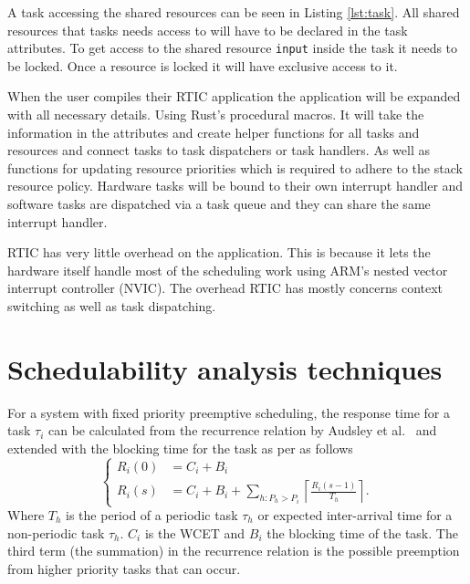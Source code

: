 A task accessing the shared resources can be seen in Listing \ref{lst:task}.
All shared resources that tasks needs access to will have to be declared in the
task attributes. To get access to the shared resource \texttt{input} inside the
task it needs to be locked. Once a resource is locked it will have exclusive
access to it.


When the user compiles their RTIC application the application will be expanded
with all necessary details. Using Rust's procedural macros. It will take the
information in the attributes and create helper functions for all tasks and
resources and connect tasks to task dispatchers or task handlers. As well as
functions for updating resource priorities which is required to adhere to the
stack resource policy. Hardware tasks will be bound to their own interrupt handler
and software tasks are dispatched via a task queue and they can share the same
interrupt handler.

RTIC has very little overhead on the application. This is because it lets the
hardware itself handle most of the scheduling work using ARM's nested vector
interrupt controller (NVIC).  The overhead RTIC has mostly concerns context switching
as well as task dispatching.

\section{Schedulability analysis techniques}
\label{theory:schedulability}
For a system with fixed priority preemptive scheduling, the response time for
a task $\tau_i$ can be calculated from the recurrence relation by Audsley et
al.\ \cite{audsley93} and extended with the blocking time for the
task as per\cite{hardrealtimecomputingsystems} as follows
\begin{equation}
    \begin{cases}
        R_{i}(0) &= C_i + B_i \\
        R_{i}(s) &= C_i + B_i + \sum\limits_{h: P_h > P_i} \left\lceil \frac{R_{i}(s-1)}{T_h} \right\rceil.
    \end{cases}
\end{equation}
Where $T_h$ is the period of a periodic task $\tau_h$ or expected inter-arrival
time for a non-periodic task $\tau_h$. $C_i$ is the WCET and $B_i$ the blocking
time of the task. The third term (the summation) in the recurrence relation is
the possible preemption from higher priority tasks that can occur.

